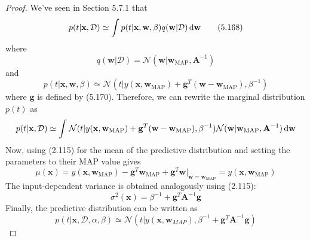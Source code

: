 \begin{proof}
    We've seen in Section 5.7.1 that 
    \begin{equation*}
        p(t | \mathbf{x}, \mathcal{D}) 
        \simeq
        \int p(t | \mathbf{x}, \mathbf{w}, \beta)q(\mathbf{w} | \mathcal{D}) \mathop{}\!\mathrm{d} \mathbf{w}
        \tag{5.168}\label{eq:5.168}
    \end{equation*}
    where 
    \begin{equation*}
        q(\mathbf{w} | \mathcal{D}) 
        = \mathcal{N}(\mathbf{w} | \mathbf{w}_{\text{MAP}}, \mathbf{A}^{-1})
        \tag{5.167}\label{eq:5.167}
    \end{equation*}
    and 
    \begin{equation*}
        p(t | \mathbf{x}, \mathbf{w}, \beta)
        \simeq \mathcal{N}(t | y(\mathbf{x}, \mathbf{w}_\text{MAP}) 
        + \mathbf{g}^T(\mathbf{w} - \mathbf{w}_\text{MAP}), \beta^{-1})
        \tag{5.171}\label{eq:5.171}
    \end{equation*}
    where $\mathbf{g}$ is defined by (5.170). Therefore, we can rewrite the marginal
    distribution $p(t)$ as 
    \[
        p(t | \mathbf{x}, \mathcal{D})
        \simeq \int_{}^{} 
        \mathcal{N}(t | y(\mathbf{x}, \mathbf{w}_\text{MAP}) 
        + \mathbf{g}^T(\mathbf{w} - \mathbf{w}_\text{MAP}), \beta^{-1})
        \mathcal{N}(\mathbf{w} | \mathbf{w}_{\text{MAP}}, \mathbf{A}^{-1})
        \mathop{}\!\mathrm{d} \mathbf{w}
    \] 
    Now, using (2.115) for the mean of the predictive distribution
    and setting the parameters to their MAP value gives
    \[
        \mu(\mathbf{x}) 
        = y(\mathbf{x}, \mathbf{w}_\text{MAP}) -\mathbf{g}^T \mathbf{w}_\text{MAP}
        + \mathbf{g}^T\mathbf{w}|_{\mathbf{w} = \mathbf{w}_\text{MAP}}
        = y(\mathbf{x}, \mathbf{w}_\text{MAP})
    \] 
    The input-dependent variance is obtained analogously using (2.115):
    \begin{equation*}
        \sigma^2(\mathbf{x}) = \beta^{-1} + \mathbf{g}^T\mathbf{A}^{-1}\mathbf{g} 
        \tag{5.173}\label{eq:5.173}
    \end{equation*}
    Finally, the predictive distribution can be written as
    \begin{equation*}
        p(t | \mathbf{x}, \mathcal{D}, \alpha, \beta)
        \simeq \mathcal{N}(t | y(\mathbf{x}, \mathbf{w}_{MAP}), 
        \beta^{-1} + \mathbf{g}^T\mathbf{A}^{-1}\mathbf{g})
        \tag{5.172}\label{eq:5.172}
    \end{equation*}
\end{proof}

